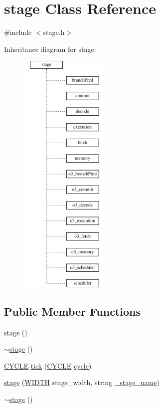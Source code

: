 \hypertarget{classstage}{
\section{stage Class Reference}
\label{classstage}
}


{\ttfamily \#include $<$stage.h$>$}

Inheritance diagram for stage:\begin{figure}[H]
\begin{center}
\leavevmode
\includegraphics[height=12.000000cm]{classstage}
\end{center}
\end{figure}
\subsection*{Public Member Functions}
\begin{DoxyCompactItemize}
\item 
\hyperlink{classstage_abc77b1bb1d0891e47dfaffe9b0203e8d}{stage} ()
\item 
\hyperlink{classstage_a680eded15b373eaba43a71a68c97bb73}{$\sim$stage} ()
\item 
\hyperlink{global_2global_8h_a7e19a550ec11d1ed921deb20c22efb5b}{CYCLE} \hyperlink{classstage_a362592f44e2c66fee59e39258380c285}{tick} (\hyperlink{global_2global_8h_a7e19a550ec11d1ed921deb20c22efb5b}{CYCLE} \hyperlink{vliwScheduler_8cpp_a1f4871d45089b039d95d3832dd123827}{cycle})
\item 
\hyperlink{classstage_ae8812f533c2c07facb960002aedcb6ab}{stage} (\hyperlink{global_2global_8h_a6fa2e24b8a418fa215e183264cbea3aa}{WIDTH} stage\_\-width, string \hyperlink{classstage_ad8500743b9a08a7d3b7a16e2c9ee7bca}{\_\-stage\_\-name})
\item 
\hyperlink{classstage_a680eded15b373eaba43a71a68c97bb73}{$\sim$stage} ()
\end{DoxyCompactItemize}
